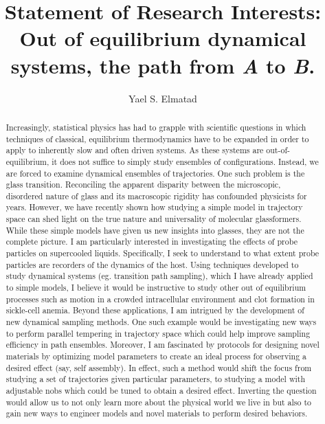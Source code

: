 \documentclass[11pt]{article}
\title{{{\textbf{Statement of Research Interests}}: \\Out of equilibrium dynamical systems, the path from \textit{A} to \textit{B}.}}
\author{Yael S. Elmatad}
\date{}                                           %
\begin{document}
\maketitle
%
\begin{abstract}
Increasingly, statistical physics has had to grapple with scientific questions in which techniques of classical, equilibrium thermodynamics have to be expanded in order to apply to inherently slow and often driven systems.   As these systems are out-of-equilibrium, it does not suffice to simply study ensembles of configurations. Instead, we are forced to examine dynamical ensembles of trajectories.  One such problem is the glass transition.  Reconciling the apparent disparity between the microscopic, disordered nature of glass and its macroscopic rigidity has confounded physicists for years. However, we have recently shown how studying a simple model in trajectory space can shed light on the true nature and universality of molecular glassformers.  While these simple models have given us new insights into glasses, they are not the complete picture. I am particularly interested in investigating the effects of probe particles on supercooled liquids.  Specifically, I seek to understand to what extent probe particles are recorders of the dynamics of the host.  Using techniques developed to study dynamical systems (eg. transition path sampling), which I have already applied to simple models, I believe it would be instructive to study other out of equilibrium processes such as motion in a crowded intracellular environment and clot formation in sickle-cell anemia.  Beyond these applications, I am intrigued by the development of new dynamical sampling methods.  One such example would be investigating new ways to perform parallel tempering in trajectory space which could help improve sampling efficiency in path ensembles.  Moreover, I am fascinated by protocols for designing novel materials by optimizing model parameters to create an ideal process for observing a desired effect (say, self assembly).  In effect, such a method would shift the focus from studying a set of trajectories given particular parameters, to studying a model with adjustable nobs which could be tuned to obtain a desired effect. Inverting the question would allow us to not only learn more about the physical world we live in but also to gain new ways to engineer models and novel materials to perform desired behaviors.



\end{abstract}
\end{document}
